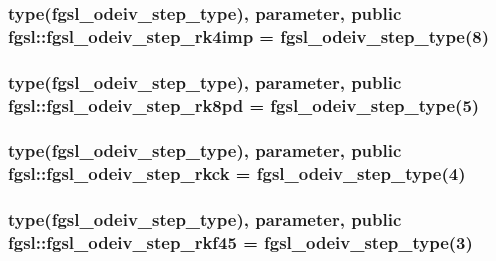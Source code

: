 \hypertarget{classfgsl_ac3387d8df1b6ef380e912fcb3a852d2b}{
\subsubsection[{fgsl\-\_\-odeiv\-\_\-step\-\_\-rk4imp}]{\setlength{\rightskip}{0pt plus 5cm}type({\bf fgsl\-\_\-odeiv\-\_\-step\-\_\-type}), parameter, public fgsl\-::fgsl\-\_\-odeiv\-\_\-step\-\_\-rk4imp = {\bf fgsl\-\_\-odeiv\-\_\-step\-\_\-type}(8)}}\label{classfgsl_ac3387d8df1b6ef380e912fcb3a852d2b}
\hypertarget{classfgsl_a104f6eb85d1676e32d4aa0a93531ef61}{
\subsubsection[{fgsl\-\_\-odeiv\-\_\-step\-\_\-rk8pd}]{\setlength{\rightskip}{0pt plus 5cm}type({\bf fgsl\-\_\-odeiv\-\_\-step\-\_\-type}), parameter, public fgsl\-::fgsl\-\_\-odeiv\-\_\-step\-\_\-rk8pd = {\bf fgsl\-\_\-odeiv\-\_\-step\-\_\-type}(5)}}\label{classfgsl_a104f6eb85d1676e32d4aa0a93531ef61}
\hypertarget{classfgsl_a0c2cde787f3c705f883a74b1be126952}{
\subsubsection[{fgsl\-\_\-odeiv\-\_\-step\-\_\-rkck}]{\setlength{\rightskip}{0pt plus 5cm}type({\bf fgsl\-\_\-odeiv\-\_\-step\-\_\-type}), parameter, public fgsl\-::fgsl\-\_\-odeiv\-\_\-step\-\_\-rkck = {\bf fgsl\-\_\-odeiv\-\_\-step\-\_\-type}(4)}}\label{classfgsl_a0c2cde787f3c705f883a74b1be126952}
\hypertarget{classfgsl_ad73c3dd0c5faf790ac4fe7c6bdfe0b75}{
\subsubsection[{fgsl\-\_\-odeiv\-\_\-step\-\_\-rkf45}]{\setlength{\rightskip}{0pt plus 5cm}type({\bf fgsl\-\_\-odeiv\-\_\-step\-\_\-type}), parameter, public fgsl\-::fgsl\-\_\-odeiv\-\_\-step\-\_\-rkf45 = {\bf fgsl\-\_\-odeiv\-\_\-step\-\_\-type}(3)}}\label{classfgsl_ad73c3dd0c5faf790ac4fe7c6bdfe0b75}
